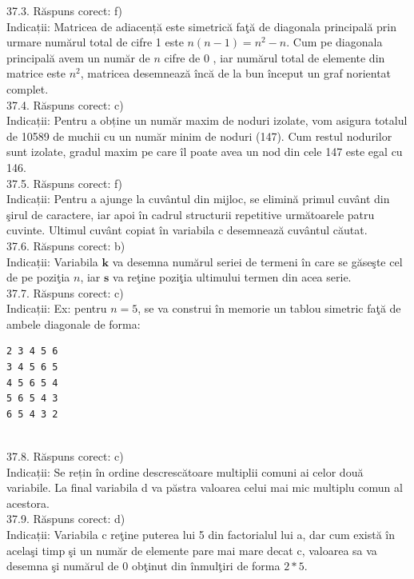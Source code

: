 37.3. Răspuns corect: f)\\
Indicații: Matricea de adiacență este simetrică faţă de diagonala principală prin urmare numărul total de cifre 1 este $n(n-1)=n^{2}-n$. Cum pe diagonala principală avem un număr de $n$ cifre de 0 , iar numărul total de elemente din matrice este $n^{2}$, matricea desemnează încă de la bun început un graf norientat complet.\\

37.4. Răspuns corect: c)\\
Indicații: Pentru a obține un număr maxim de noduri izolate, vom asigura totalul de 10589 de muchii cu un număr minim de noduri (147). Cum restul nodurilor sunt izolate, gradul maxim pe care îl poate avea un nod din cele 147 este egal cu 146.\\

37.5. Răspuns corect: f)\\
Indicații: Pentru a ajunge la cuvântul din mijloc, se elimină primul cuvânt din şirul de caractere, iar apoi în cadrul structurii repetitive următoarele patru cuvinte. Ultimul cuvânt copiat în variabila c desemnează cuvântul căutat.\\

37.6. Răspuns corect: b)\\
Indicații: Variabila $\mathbf{k}$ va desemna numărul seriei de termeni în care se găseşte cel de pe poziţia $n$, iar $\mathbf{s}$ va reţine poziţia ultimului termen din acea serie.\\

37.7. Răspuns corect: c)\\
Indicații: Ex: pentru $n=5$, se va construi în memorie un tablou simetric faţă de ambele diagonale de forma:
\begin{verbatim}
2 3 4 5 6  
3 4 5 6 5  
4 5 6 5 4  
5 6 5 4 3  
6 5 4 3 2
\end{verbatim}\\

37.8. Răspuns corect: c)\\
Indicații: Se rețin în ordine descrescătoare multiplii comuni ai celor două variabile. La final variabila d va păstra valoarea celui mai mic multiplu comun al acestora.\\

37.9. Răspuns corect: d)\\
Indicații: Variabila c reţine puterea lui 5 din factorialul lui a, dar cum există în acelaşi timp şi un număr de elemente pare mai mare decat c, valoarea sa va desemna şi numărul de 0 obţinut din înmulţiri de forma $2*5$.\\

